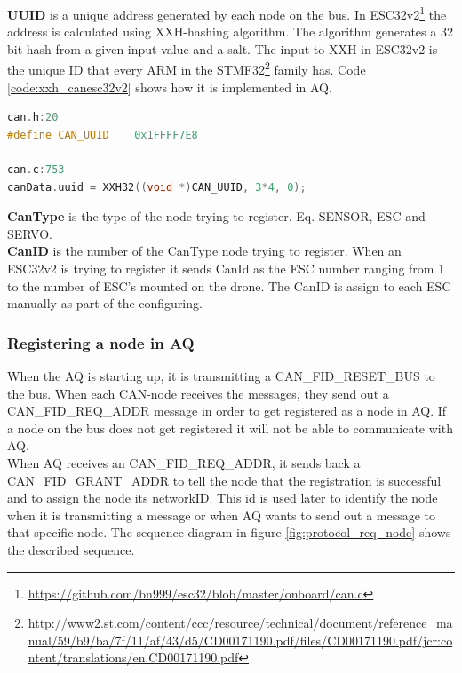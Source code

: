 \textbf{UUID} is a unique address generated by each node on the bus. In ESC32v2\footnote{\url{https://github.com/bn999/esc32/blob/master/onboard/can.c}} the address is calculated using XXH-hashing algorithm. The algorithm generates a 32 bit hash from a given input value and a salt.
The input to XXH in ESC32v2 is the unique ID that every ARM in the STMF32\footnote{\url{http://www2.st.com/content/ccc/resource/technical/document/reference_manual/59/b9/ba/7f/11/af/43/d5/CD00171190.pdf/files/CD00171190.pdf/jcr:content/translations/en.CD00171190.pdf}}
 family has. Code \ref{code:xxh_canesc32v2} shows how it is implemented in AQ.

\begin{lstlisting}[language = c, caption = Snippet showing UUID generated in ESC32v2, label=code:xxh_canesc32v2]
can.h:20
#define CAN_UUID	0x1FFFF7E8

can.c:753
canData.uuid = XXH32((void *)CAN_UUID, 3*4, 0);
\end{lstlisting}

\textbf{CanType} is the type of the node trying to register. Eq. SENSOR, ESC and SERVO.  \\

\textbf{CanID} is the number of the CanType node trying to register. When an ESC32v2 is trying to register it sends CanId as the ESC number ranging from 1 to the number of ESC's mounted on the drone. The CanID is assign to each ESC manually as part of the configuring.

\renewcommand{\mess}[4][0]{
  \stepcounter{seqlevel}
  \path
  (#2)+(0,-\theseqlevel*\unitfactor-0.7*\unitfactor) node (mess from) {};
  \addtocounter{seqlevel}{#1}
  \path
  (#4)+(0,-\theseqlevel*\unitfactor-0.7*\unitfactor) node (mess to) {};
  \draw[->,>=angle 60] (mess from) -- (mess to) node[midway, above]
  {#3};
}

\subsubsection*{Registering a node in AQ}\label{sec:reg_aq_node}

When the AQ is starting up, it is transmitting a CAN\_FID\_RESET\_BUS to the bus.
When each CAN-node receives the messages, they send out a CAN\_FID\_REQ\_ADDR message in order to get registered as a node in AQ.
If a node on the bus does not get registered it will not be able to communicate with AQ. \\
When AQ receives an CAN\_FID\_REQ\_ADDR, it sends back a CAN\_FID\_GRANT\_ADDR to tell the node that the registration is successful and to assign the node its networkID.
This id is used later to identify the node when it is transmitting a message or when AQ wants to send out a message to that specific node.
The sequence diagram in figure \ref{fig:protocol_req_node} shows the described sequence.

